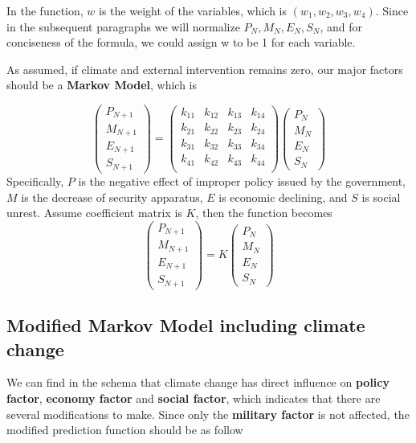 \documentclass{mcmthesis}
\begin{document}
	In the function, $w$ is the weight of the variables, which is $(w_1, w_2, w_3, w_4)$. Since in the subsequent paragraphs we will normalize $P_N, M_N, E_N, S_N$, and for conciseness of the formula, we could assign w to be 1 for each variable.
	
	As assumed, if climate and external intervention remains zero, our major factors should be a \textbf{Markov Model}, which is
	
	$$
	\left(
	\begin{matrix}
	P_{N+1} \\ M_{N+1} \\ E_{N+1} \\ S_{N+1}
	\end{matrix}
	\right) 
	= 
	\left(
	\begin{matrix}
	k_{11} & k_{12} & k_{13} & k_{14} \\
	k_{21} & k_{22} & k_{23} & k_{24} \\
	k_{31} & k_{32} & k_{33} & k_{34} \\
	k_{41} & k_{42} & k_{43} & k_{44} \\
	\end{matrix}
	\right) 
	\left(
	\begin{matrix}
	P_N \\ M_N \\ E_N \\ S_N
	\end{matrix}
	\right) 
	$$
	Specifically, $P$ is the negative effect of improper policy issued by the government, $M$ is the decrease of security apparatus, $E$ is economic declining, and $S$ is social unrest. Assume coefficient matrix is $K$, then the function becomes
	$$
	\left(
	\begin{matrix}
	P_{N+1} \\ M_{N+1} \\ E_{N+1} \\ S_{N+1}
	\end{matrix}
	\right) 
	= 
	K
	\left(
	\begin{matrix}
	P_N \\ M_N \\ E_N \\ S_N
	\end{matrix}
	\right) 
	$$
	
	\subsection{Modified Markov Model including climate change}
	
	We can find in the schema that climate change has direct influence on \textbf{policy factor}, \textbf{economy factor} and \textbf{social factor}, which indicates that there are several modifications to make. Since only the \textbf{military factor} is not affected, the modified prediction function should be as follow
	
\end{document}
